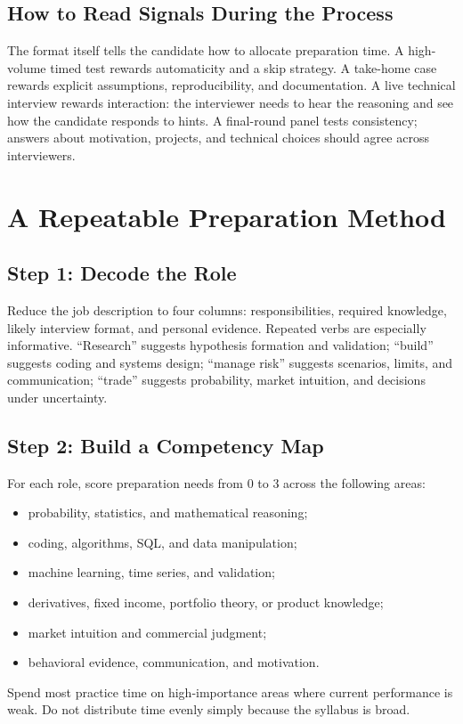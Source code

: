 \documentclass[11pt,letterpaper,openany]{book}
\begin{document}
\subsection{How to Read Signals During the Process}
The format itself tells the candidate how to allocate preparation time. A high-volume timed test rewards automaticity and a skip strategy. A take-home case rewards explicit assumptions, reproducibility, and documentation. A live technical interview rewards interaction: the interviewer needs to hear the reasoning and see how the candidate responds to hints. A final-round panel tests consistency; answers about motivation, projects, and technical choices should agree across interviewers.

\section{A Repeatable Preparation Method}

\subsection{Step 1: Decode the Role}
Reduce the job description to four columns: responsibilities, required knowledge, likely interview format, and personal evidence. Repeated verbs are especially informative. ``Research'' suggests hypothesis formation and validation; ``build'' suggests coding and systems design; ``manage risk'' suggests scenarios, limits, and communication; ``trade'' suggests probability, market intuition, and decisions under uncertainty.

\subsection{Step 2: Build a Competency Map}
For each role, score preparation needs from 0 to 3 across the following areas:
\begin{itemize}
  \item probability, statistics, and mathematical reasoning;
  \item coding, algorithms, SQL, and data manipulation;
  \item machine learning, time series, and validation;
  \item derivatives, fixed income, portfolio theory, or product knowledge;
  \item market intuition and commercial judgment;
  \item behavioral evidence, communication, and motivation.
\end{itemize}
Spend most practice time on high-importance areas where current performance is weak. Do not distribute time evenly simply because the syllabus is broad.
\end{document}
